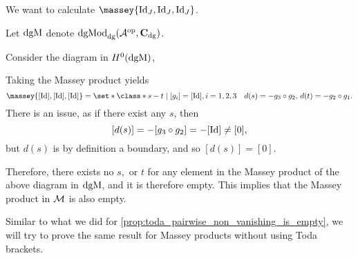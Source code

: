 \begin{example}
	We want to calculate \( \massey{\Id_J, \Id_J, \Id_J} \).

    Let \( \operatorname{dgM} \) denote \( \operatorname{dgMod}_{\operatorname{dg}}({\mathcal{A}}^{\operatorname{op}}, \operatorname{\mathbf{C}}_{\operatorname{dg}}) \).

    Consider the diagram in \( H^0(\operatorname{dgM}) \),
    \begin{center}
    \end{center}

    Taking the Massey product yields
    \[
        \massey{[\Id], [\Id], [\Id]} =
        \set*{
            \class*{
                s - t
            }
            \mid [g_i] = [\Id], i = 1, 2, 3 \quad
            d(s) = - g_3 \circ g_2, \,
            d(t) = -g_2 \circ g_1
        }.
    \]
    There is an issue, as if there exist any \( s \), then
    \[
        [d(s)] = - [g_3 \circ g_2] = - [\operatorname{Id}] \neq [0],
    \]
    but \( d(s) \) is by definition a boundary, and so \( [d(s)] = [0] \).

    Therefore, there exists no \( s, \) or \( t \) for any element in the Massey product of the above diagram in \( \operatorname{dgM} \), and it is therefore empty. This implies that the Massey product in \( {\mathcal{M}} \) is also empty.
\end{example}

Similar to what we did for \autoref{prop:toda_pairwise_non_vanishing_is_empty}, we will try to prove the same result for Massey products without using Toda brackets.


